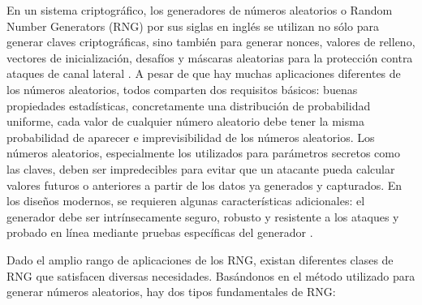 	En un sistema criptográfico, los generadores de números aleatorios o Random Number Generators (RNG) por sus siglas en inglés se utilizan no sólo para generar claves criptográficas, sino también para generar nonces, valores de relleno, vectores de inicialización, desafíos y máscaras aleatorias para la protección contra ataques de canal lateral \cite{Petura2016}. A pesar de que hay muchas aplicaciones diferentes de los números aleatorios, todos comparten dos requisitos básicos: buenas propiedades estadísticas, concretamente una distribución de probabilidad uniforme, cada valor de cualquier número aleatorio debe tener la misma probabilidad de aparecer e imprevisibilidad de los números aleatorios. Los números aleatorios, especialmente los utilizados para parámetros secretos como las claves, deben ser impredecibles para evitar que un atacante pueda calcular valores futuros o anteriores a partir de los datos ya generados y capturados. En los diseños modernos, se requieren algunas características adicionales: el generador debe ser intrínsecamente seguro, robusto y resistente a los ataques y probado en línea mediante pruebas específicas del generador \cite{Badrignans2011}.
		
	Dado el amplio rango de aplicaciones de los RNG, existan diferentes clases de RNG que satisfacen diversas necesidades. Basándonos en el método utilizado para generar números aleatorios, hay dos tipos fundamentales de RNG:
		
